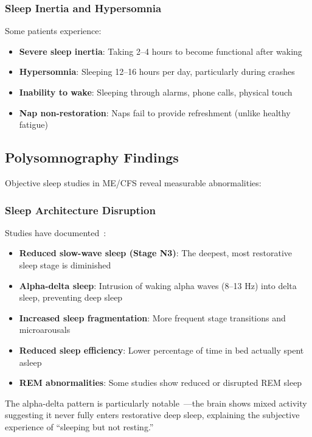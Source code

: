 \subsubsection{Sleep Inertia and Hypersomnia}

Some patients experience:
\begin{itemize}
    \item \textbf{Severe sleep inertia}: Taking 2--4 hours to become functional after waking
    \item \textbf{Hypersomnia}: Sleeping 12--16 hours per day, particularly during crashes
    \item \textbf{Inability to wake}: Sleeping through alarms, phone calls, physical touch
    \item \textbf{Nap non-restoration}: Naps fail to provide refreshment (unlike healthy fatigue)
\end{itemize}

\subsection{Polysomnography Findings}

Objective sleep studies in ME/CFS reveal measurable abnormalities:

\subsubsection{Sleep Architecture Disruption}

Studies have documented~\cite{Jackson2012sleepAbnormalities,%
Reeves2006sleepCharacteristics}:
\begin{itemize}
    \item \textbf{Reduced slow-wave sleep (Stage N3)}: The deepest, most restor\-ative sleep stage is diminished
    \item \textbf{Alpha-delta sleep}: Intrusion of waking alpha waves (8--13 Hz) into delta sleep, preventing deep sleep~\cite{Moldofsky1975alphaDeltaSleep}
    \item \textbf{Increased sleep fragmentation}: More frequent stage transitions and microarousals
    \item \textbf{Reduced sleep efficiency}: Lower percentage of time in bed actually spent asleep
    \item \textbf{REM abnormalities}: Some studies show reduced or disrupted REM sleep
\end{itemize}

The alpha-delta pattern is particularly notable~\cite{Moldofsky1975alphaDeltaSleep}---the brain shows mixed activity suggesting it never fully enters restorative deep sleep, explaining the subjective experience of ``sleeping but not resting.''

